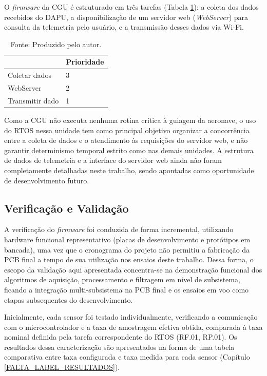 O \textit{firmware} da CGU é estruturado em três tarefas (Tabela \ref{Tab:RTOSPrioridadesCGU}): a coleta dos dados recebidos do DAPU, a disponibilização de um servidor web (\textit{WebServer}) para consulta da telemetria pelo usuário, e a transmissão desses dados via Wi-Fi.

\begin{table}[H]
\centering
\caption{Prioridade de cada tarefa da CGU no RTOS.}
\begin{tabular}{|l|l|}
\hline
\rowcolor[HTML]{C0C0C0} 
\multicolumn{1}{|c|}{\textbf{Tarefa}} &
\multicolumn{1}{c|}{\textbf{Prioridade}} \\ \hline
Coletar dados & 3 \\ \hline
WebServer & 2 \\ \hline
Transmitir dado & 1 \\ \hline
\end{tabular}
\label{Tab:RTOSPrioridadesCGU}
\caption*{Fonte: Produzido pelo autor.}
\end{table}

Como a CGU não executa nenhuma rotina crítica à guiagem da aeronave, o uso do RTOS nessa unidade tem como principal objetivo organizar a concorrência entre a coleta de dados e o atendimento às requisições do servidor web, e não garantir determinismo temporal estrito como nas demais unidades. A estrutura de dados de telemetria e a interface do servidor web ainda não foram completamente detalhadas neste trabalho, sendo apontadas como oportunidade de desenvolvimento futuro.

\subsection{Verificação e Validação}
\label{subsec:validacaoEKF}

A verificação do \textit{firmware} foi conduzida de forma incremental, utilizando hardware funcional representativo (placas de desenvolvimento e protótipos em bancada), uma vez que o cronograma do projeto não permitiu a fabricação da PCB final a tempo de sua utilização nos ensaios deste trabalho. Dessa forma, o escopo da validação aqui apresentada concentra-se na demonstração funcional dos algoritmos de aquisição, processamento e filtragem em nível de subsistema, ficando a integração multi-subsistema na PCB final e os ensaios em voo como etapas subsequentes do desenvolvimento.

Inicialmente, cada sensor foi testado individualmente, verificando a comunicação com o microcontrolador e a taxa de amostragem efetiva obtida, comparada à taxa nominal definida pela tarefa correspondente do RTOS (RF.01, RP.01). Os resultados dessa caracterização são apresentados na forma de uma tabela comparativa entre taxa configurada e taxa medida para cada sensor (Capítulo \ref{FALTA_LABEL_RESULTADOS}).


